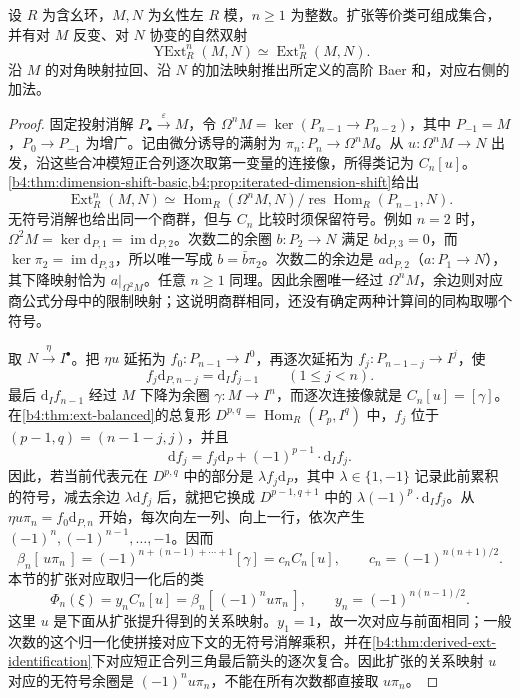 \begin{theorem}\label{b4:thm:yoneda-ext-comparison}
	设 \(R\) 为含幺环，\(M,N\) 为幺性左 \(R\) 模，\(n\ge1\) 为整数。扩张等价类可组成集合，并有对 \(M\) 反变、对 \(N\) 协变的自然双射
	\[
		\operatorname{YExt}_R^n(M,N)\simeq\operatorname{Ext}_R^n(M,N).
	\]
	沿 \(M\) 的对角映射拉回、沿 \(N\) 的加法映射推出所定义的高阶 Baer 和，对应右侧的加法。
\end{theorem}
\begin{proof}
	固定投射消解 \(P_\bullet\xrightarrow{\varepsilon}M\)，令 \(\Omega^nM=\ker(P_{n-1}\to P_{n-2})\)，其中 \(P_{-1}=M\)，\(P_0\to P_{-1}\) 为增广。记由微分诱导的满射为 \(\pi_n:P_n\to\Omega^nM\)。从 \(u:\Omega^nM\to N\) 出发，沿这些合冲模短正合列逐次取第一变量的连接像，所得类记为 \(C_n[u]\)。\cref{b4:thm:dimension-shift-basic,b4:prop:iterated-dimension-shift}给出
	\[
		\operatorname{Ext}_R^n(M,N) \simeq\operatorname{Hom}_R(\Omega^nM,N) /\operatorname{res}\operatorname{Hom}_R(P_{n-1},N).
	\]
	无符号消解也给出同一个商群，但与 \(C_n\) 比较时须保留符号。例如 \(n=2\) 时，\(\Omega^2M=\ker\mathrm{d}_{P,1}=\operatorname{im}\mathrm{d}_{P,2}\)。次数二的余圈 \(b:P_2\to N\) 满足 \(b\mathrm{d}_{P,3}=0\)，而 \(\ker\pi_2=\operatorname{im}\mathrm{d}_{P,3}\)，所以唯一写成 \(b=\bar b\pi_2\)。次数二的余边是 \(a\mathrm{d}_{P,2}\)（\(a:P_1\to N\)），其下降映射恰为 \(a|_{\Omega^2M}\)。任意 \(n\ge1\) 同理。因此余圈唯一经过 \(\Omega^nM\)，余边则对应商公式分母中的限制映射；这说明商群相同，还没有确定两种计算间的同构取哪个符号。

	取 \(N\xrightarrow{\eta}I^\bullet\)。把 \(\eta u\) 延拓为 \(f_0:P_{n-1}\to I^0\)，再逐次延拓为 \(f_j:P_{n-1-j}\to I^j\)，使
	\[
		f_j\mathrm{d}_{P,n-j}=\mathrm{d}_If_{j-1}\qquad(1\le j<n).
	\]
	最后 \(\mathrm{d}_If_{n-1}\) 经过 \(M\) 下降为余圈 \(\gamma:M\to I^n\)，而逐次连接像就是 \(C_n[u]=[\gamma]\)。在\cref{b4:thm:ext-balanced}的总复形 \(D^{p,q}=\operatorname{Hom}_R(P_p,I^q)\) 中，\(f_j\) 位于 \((p-1,q)=(n-1-j,j)\)，并且
	\[
		\mathrm{d}f_j=f_j\mathrm{d}_P+(-1)^{p-1}\cdot\mathrm{d}_If_j.
	\]
	因此，若当前代表元在 \(D^{p,q}\) 中的部分是 \(\lambda f_j\mathrm{d}_P\)，其中 \(\lambda\in\{1,-1\}\) 记录此前累积的符号，减去余边 \(\lambda\mathrm{d}f_j\) 后，就把它换成 \(D^{p-1,q+1}\) 中的 \(\lambda(-1)^p\cdot\mathrm{d}_If_j\)。从 \(\eta u\pi_n=f_0\mathrm{d}_{P,n}\) 开始，每次向左一列、向上一行，依次产生 \((-1)^n,(-1)^{n-1},\ldots,-1\)。因而
	\[
		\beta_n[\,u\pi_n\,] =(-1)^{n+(n-1)+\cdots+1}[\gamma] =c_nC_n[u],\qquad c_n=(-1)^{n(n+1)/2}.
	\]
	本节的扩张对应取归一化后的类
	\[
		\Phi_n(\xi)=y_nC_n[u] =\beta_n[\,(-1)^nu\pi_n\,], \qquad y_n=(-1)^{n(n-1)/2}.
	\]
	这里 \(u\) 是下面从扩张提升得到的关系映射。\(y_1=1\)，故一次对应与前面相同；一般次数的这个归一化使拼接对应下文的无符号消解乘积，并在\cref{b4:thm:derived-ext-identification}下对应短正合列三角最后箭头的逐次复合。因此扩张的关系映射 \(u\) 对应的无符号余圈是 \((-1)^nu\pi_n\)，不能在所有次数都直接取 \(u\pi_n\)。


\end{proof}
